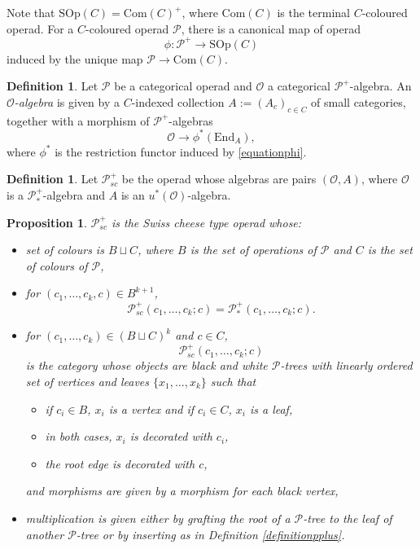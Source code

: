 \documentclass[]{amsart}
\newtheorem{proposition}[theorem]{Proposition}
\theoremstyle{definition}
\newtheorem{definition}[theorem]{Definition}
\begin{document}
Note that $\mathrm{SOp}(C) = \mathrm{Com}(C)^+$, where $\mathrm{Com}(C)$ is the terminal $C$-coloured operad. For a $C$-coloured operad $\mathcal{P}$, there is a canonical map of operad \cite[Section 3.14]{bwdquasitame}
\begin{equation}\label{equationphi}
	\phi: \mathcal{P}^+ \to \mathrm{SOp}(C)
\end{equation}
induced by the unique map $\mathcal{P} \to \mathrm{Com}(C)$.

\begin{definition}\label{definitionalgebraofalgebra}\cite[Definition 3.3]{bwdquasitame}
	Let $\mathcal{P}$ be a categorical operad and $\mathcal{O}$ a categorical $\mathcal{P}^+$-algebra. An \emph{$\mathcal{O}$-algebra} is given by a $C$-indexed collection $A := (A_c)_{c \in C}$ of small categories, together with a morphism of $\mathcal{P}^+$-algebras
	\[
		\mathcal{O} \to \phi^* (\mathrm{End}_A),
	\]
	where $\phi^*$ is the restriction functor induced by \eqref{equationphi}.
\end{definition}


\begin{definition}
	Let $\mathcal{P}_{sc}^+$ be the operad whose algebras are pairs $(\mathcal{O},A)$, where $\mathcal{O}$ is a $\mathcal{P}_*^+$-algebra and $A$ is an $u^*(\mathcal{O})$-algebra.
\end{definition}





\begin{proposition}\label{propositionswisscheeseplus}
	$\mathcal{P}_{sc}^+$ is the Swiss cheese type operad whose:
	\begin{itemize}
		\item set of colours is $B \sqcup C$, where $B$ is the set of operations of $\mathcal{P}$ and $C$ is the set of colours of $\mathcal{P}$,
		\item for $(c_1,\ldots,c_k,c) \in B^{k+1}$,
		\[
			\mathcal{P}_{sc}^+(c_1,\ldots,c_k;c) = \mathcal{P}_*^+(c_1,\ldots,c_k;c).
		\]
		\item for $(c_1,\ldots,c_k) \in (B \sqcup C)^k$ and $c \in C$,
		\[
		\mathcal{P}_{sc}^+(c_1,\ldots,c_k;c)
		\]
		is the category whose objects are black and white $\mathcal{P}$-trees with linearly ordered set of vertices and leaves $\{x_1,\ldots,x_k\}$ such that
		\begin{itemize}
			\item if $c_i \in B$, $x_i$ is a vertex and if $c_i \in C$, $x_i$ is a leaf,
			\item in both cases, $x_i$ is decorated with $c_i$,
			\item the root edge is decorated with $c$,
		\end{itemize}
		and morphisms are given by a morphism for each black vertex,
		\item multiplication is given either by grafting the root of a $\mathcal{P}$-tree to the leaf of another $\mathcal{P}$-tree or by inserting as in Definition \ref{definitionpplus}.
	\end{itemize}
\end{proposition}
\end{document}
